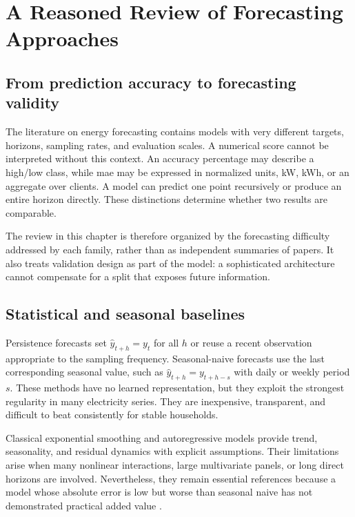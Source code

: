 \chapter{A Reasoned Review of Forecasting Approaches}
\label{chap:stateofart}

\section{From prediction accuracy to forecasting validity}

The literature on energy forecasting contains models with very different targets, horizons, sampling rates, and evaluation scales. A numerical score cannot be interpreted without this context. An accuracy percentage may describe a high/low class, while \ac{mae} may be expressed in normalized units, kW, kWh, or an aggregate over clients. A model can predict one point recursively or produce an entire horizon directly. These distinctions determine whether two results are comparable.

The review in this chapter is therefore organized by the forecasting difficulty addressed by each family, rather than as independent summaries of papers. It also treats validation design as part of the model: a sophisticated architecture cannot compensate for a split that exposes future information.

\section{Statistical and seasonal baselines}

Persistence forecasts set $\hat y_{t+h}=y_t$ for all $h$ or reuse a recent observation appropriate to the sampling frequency. Seasonal-naive forecasts use the last corresponding seasonal value, such as $\hat y_{t+h}=y_{t+h-s}$ with daily or weekly period $s$. These methods have no learned representation, but they exploit the strongest regularity in many electricity series. They are inexpensive, transparent, and difficult to beat consistently for stable households.

Classical exponential smoothing and autoregressive models provide trend, seasonality, and residual dynamics with explicit assumptions. Their limitations arise when many nonlinear interactions, large multivariate panels, or long direct horizons are involved. Nevertheless, they remain essential references because a model whose absolute error is low but worse than seasonal naive has not demonstrated practical added value \cite{hyndman2021fpp3}.

